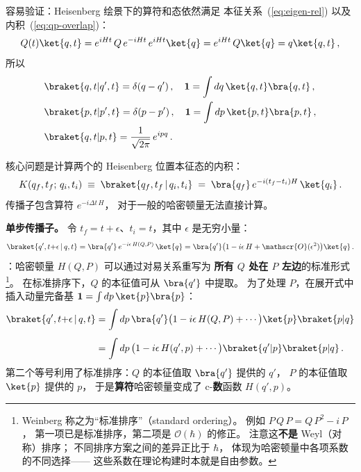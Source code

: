 容易验证：Heisenberg 绘景下的算符和态依然满足
本征关系~(\ref{eq:eigen-rel})
以及内积~(\ref{eq:qp-overlap})：
\[
  Q(t)\ket{q,t}
  =e^{iHt}\,Q\,e^{-iHt}\,e^{iHt}\ket{q}
  =e^{iHt}\,Q\ket{q}=q\ket{q,t}\,,
\]
所以
\begin{subequations}\label{eq:Heis-complete}
  \begin{align}
    &\braket{q,t|q',t}=\delta(q-q')\,,\quad
      \mathbf{1}=\int dq\,\ket{q,t}\bra{q,t}\,,\\
    &\braket{p,t|p',t}=\delta(p-p')\,,\quad
      \mathbf{1}=\int dp\,\ket{p,t}\bra{p,t}\,,\\
    &\braket{q,t|p,t}=\frac{1}{\sqrt{2\pi}}\,e^{ipq}\,.
  \end{align}
\end{subequations}

核心问题是计算两个的
Heisenberg 位置本征态的内积：
\begin{equation}\label{eq:propagator}
  K(q_f,t_f;\,q_i,t_i)
  \;\equiv\;\braket{q_f,t_f\,|\,q_i,t_i}
  \;=\;\bra{q_f}\,e^{-i(t_f-t_i)H}\,\ket{q_i}\,.
\end{equation}
传播子包含算符 $e^{-i\Delta t\,H}$，
对于一般的哈密顿量无法直接计算。

\medskip\noindent
\textbf{单步传播子。}
令 $t_f=t+\epsilon$、$t_i=t$，其中 $\epsilon$ 是无穷小量：
\begin{equation}\label{eq:single-step-0}
  \braket{q',t{+}\epsilon\,|\,q,t}
  =\bra{q'}\,e^{-i\epsilon\,H(Q,P)}\,\ket{q}
  =\bra{q'}\bigl(1-i\epsilon\,H+\mathscr{O}(\epsilon^2)\bigr)\ket{q}\,.
\end{equation}
：哈密顿量 $H(Q,P)$ 可以通过对易关系重写为
\textbf{所有 $Q$ 处在 $P$ 左边}的标准形式\footnote{%
  Weinberg 称之为``标准排序''（standard ordering）。
  例如 $P\,Q\,P = Q\,P^2 - i\,P$，
  第一项已是标准排序，第二项是 $\mathscr{O}(\hbar)$ 的修正。
  注意这\textbf{不是} Weyl（对称）排序；
  不同排序方案之间的差异正比于 $\hbar$，
  体现为哈密顿量中各项系数的不同选择——
  这些系数在理论构建时本就是自由参数。}。
在标准排序下，$Q$ 的本征值可从 $\bra{q'}$ 中提取。
为了处理 $P$，在展开式中插入动量完备基
$\mathbf{1}=\int dp\,\ket{p}\bra{p}$：
\begin{align}
  \braket{q',t{+}\epsilon\,|\,q,t}
  &=\int dp\,
    \bra{q'}\bigl(1-i\epsilon\,H(Q,P)+\cdots\bigr)
    \ket{p}\braket{p|q}
    \notag\\[4pt]
  &=\int dp\,
    \bigl(1-i\epsilon\,H(q',p)+\cdots\bigr)
    \braket{q'|p}\braket{p|q}\,.
    \label{eq:single-step-1}
\end{align}
第二个等号利用了标准排序：$Q$ 的本征值取 $\bra{q'}$ 提供的 $q'$，
$P$ 的本征值取 $\ket{p}$ 提供的 $p$，
于是\textbf{算符}哈密顿量变成了 c-\textbf{数}函数 $H(q',p)$。

